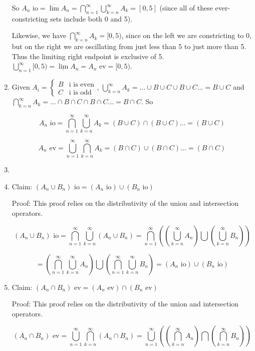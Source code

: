\documentclass[12pt]{article}
\begin{document}
\begin{enumerate}
So $A_n \mbox{ io}=\overline{\lim} A_n = \bigcap^\infty_{n=1} \bigcup_{k=n}^\infty A_k = [0,5]$ (since all of these ever-constricting sets include both 0 and 5).

Likewise, we have $\bigcap^\infty_{k=n} A_k = [0,5)$, since on the left we are constricting to 0, but on the right we are oscillating from just less than 5 to just more than 5. Thus the limiting right endpoint is exclusive of 5. $\bigcup^\infty_{n=1}[0,5)=\underline{\lim} A_n= A_n \mbox{ ev}=[0,5)$.

\item Given $A_i= \begin{cases} B & \mbox{i is even} \\ C & \mbox{i is odd} \end{cases}$, $\bigcup^\infty_{k=n} A_k = \dots \cup B \cup C \cup B \cup C \dots = B \cup C$ and $\bigcap^\infty_{k=n} A_k = \dots \cap B \cap C \cap B \cap C \dots = B \cap C$. So 

$$ A_n \mbox{ io}=\bigcap^\infty_{n=1}\bigcup^\infty_{k=n} A_k = (B \cup C) \cap (B \cup C)\dots = (B \cup C)$$

$$ A_n \mbox{ ev}=\bigcup^\infty_{n=1}\bigcap^\infty_{k=n} A_k = (B \cap C) \cup (B \cap C)\dots = (B \cap C)$$

\item

\item Claim: $(A_n \cup B_n)\mbox{ io} = (A_n \mbox{ io})\cup (B_n\mbox{ io})$

Proof: This proof relies on the distributivity of the union and intersection operators. 

$$(A_n \cup B_n)\mbox{ io} = \bigcap^\infty_{n=1}\bigcup^\infty_{k=n}(A_n \cup B_n) = \bigcap^\infty_{n=1} \left( \left( \bigcup^\infty_{k=n}A_n \right) \bigcup \left( \bigcup^\infty_{k=n}B_n \right) \right)$$

$$ = \left( \bigcap^\infty_{n=1}\bigcup^\infty_{k=n}A_n \right) \bigcup \left( \bigcap^\infty_{n=1} \bigcup^\infty_{k=n}B_n \right) = (A_n \mbox{ io})\cup (B_n\mbox{ io}) $$

\item Claim: $(A_n \cap B_n)\mbox{ ev} = (A_n \mbox{ ev})\cap (B_n\mbox{ ev})$

Proof: This proof relies on the distributivity of the union and intersection operators. 

$$(A_n \cap B_n)\mbox{ ev} = \bigcup^\infty_{n=1}\bigcap^\infty_{k=n}(A_n \cap B_n) = \bigcup^\infty_{n=1} \left( \left( \bigcap^\infty_{k=n}A_n \right) \bigcap \left( \bigcap^\infty_{k=n}B_n \right) \right)$$


\end{enumerate}
\end{document}
